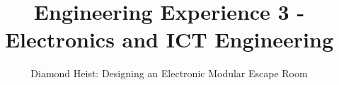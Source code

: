 \documentclass[11pt,a4paper,twocolumn]{report}
\title{Engineering Experience 3 - Electronics and ICT Engineering}
\subtitle{Diamond Heist: Designing an Electronic Modular Escape Room }
\begin{document}
	\preface
	
	
	
	
	
	


	
	

    \appendix
    \appendixpage
	

%	

	\backcover
\end{document}
